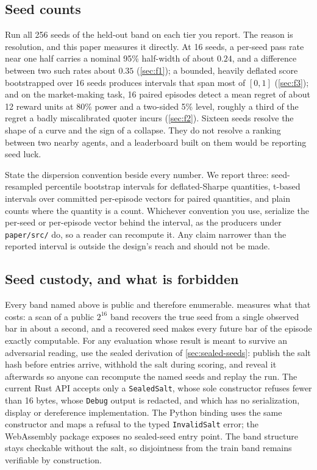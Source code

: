 \subsection{Seed counts}\label{sec:protocol-seeds}

Run all 256 seeds of the held-out band on each tier you report. The reason is resolution, and this paper measures it directly. At 16 seeds, a per-seed pass rate near one half carries a nominal 95\% half-width of about $0.24$, and a difference between two such rates about $0.35$ (\cref{sec:f1}); a bounded, heavily deflated score bootstrapped over 16 seeds produces intervals that span most of $[0,1]$ (\cref{sec:f3}); and on the market-making task, 16 paired episodes detect a mean regret of about 12 reward units at 80\% power and a two-sided 5\% level, roughly a third of the regret a badly miscalibrated quoter incurs (\cref{sec:f2}). Sixteen seeds resolve the shape of a curve and the sign of a collapse. They do not resolve a ranking between two nearby agents, and a leaderboard built on them would be reporting seed luck.

State the dispersion convention beside every number. We report three: seed-resampled percentile bootstrap intervals for deflated-Sharpe quantities, t-based intervals over committed per-episode vectors for paired quantities, and plain counts where the quantity is a count. Whichever convention you use, serialize the per-seed or per-episode vector behind the interval, as the producers under \texttt{paper/src/} do, so a reader can recompute it. Any claim narrower than the reported interval is outside the design's reach and should not be made.

\subsection{Seed custody, and what is forbidden}\label{sec:protocol-custody}

Every band named above is public and therefore enumerable.  measures what that costs: a scan of a public $2^{16}$ band recovers the true seed from a single observed bar in about a second, and a recovered seed makes every future bar of the episode exactly computable. For any evaluation whose result is meant to survive an adversarial reading, use the sealed derivation of \cref{sec:sealed-seeds}: publish the salt hash before entries arrive, withhold the salt during scoring, and reveal it afterwards so anyone can recompute the named seeds and replay the run. The current Rust API accepts only a \texttt{SealedSalt}, whose sole constructor refuses fewer than 16 bytes, whose \texttt{Debug} output is redacted, and which has no serialization, display or dereference implementation. The Python binding uses the same constructor and maps a refusal to the typed \texttt{InvalidSalt} error; the WebAssembly package exposes no sealed-seed entry point. The band structure stays checkable without the salt, so disjointness from the train band remains verifiable by construction.

